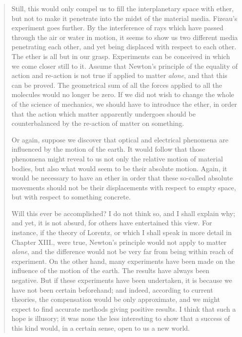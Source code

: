 \begin{quote}
     Still, this would only compel us to fill the interplanetary space with ether, but not to make it penetrate into the midst of the material media.  Fizeau's experiment goes further.  By the interference of rays which have passed through the air or water in motion, it seems to show us two different media penetrating each other, and yet being displaced with respect to each other.  The ether is all but in our grasp.  Experiments can be conceived in which we come closer still to it.  Assume that Newton's principle of the equality of action and re-action is not true if applied to matter \emph{alone}, and that this can be proved.  The geometrical sum of all the forces applied to all the molecules would no longer be zero.  If we did not wish to change the whole of the science of mechanics, we should have to introduce the ether, in order that the action which matter apparently undergoes should be counterbalanced by the re-action of matter on something.
     
     Or again, suppose we discover that optical and electrical phenomena are influenced by the motion of the earth.  It would follow that those phenomena might reveal to us not only the relative motion of material bodies, but also what would seem to be their absolute motion.  Again, it would be necessary to have an ether in order that these so-called absolute movements should not be their displacements with respect to empty space, but with respect to something concrete.  
     
     Will this ever be accomplished?  I do not think so, and I shall explain why; and yet, it is not absurd, for others have entertained this view.  For instance, if the theory of Lorentz, or which I shall speak in more detail in Chapter XIII., were true, Newton's principle would not apply to matter \emph{alone}, and the difference would not be very far from being within reach of experiment.  On the other hand, many experiments have been made on the influence of the motion of the earth.  The results have always been negative.  But if these experiments have been undertaken, it is because we have not been certain beforehand; and indeed, according to current theories, the compensation would be only approximate, and we might expect to find accurate methods giving positive results.  I think that such a hope is illusory; it was none the less interesting to show that a success of this kind would, in a certain sense, open to us a new world.
     

\end{quote}
